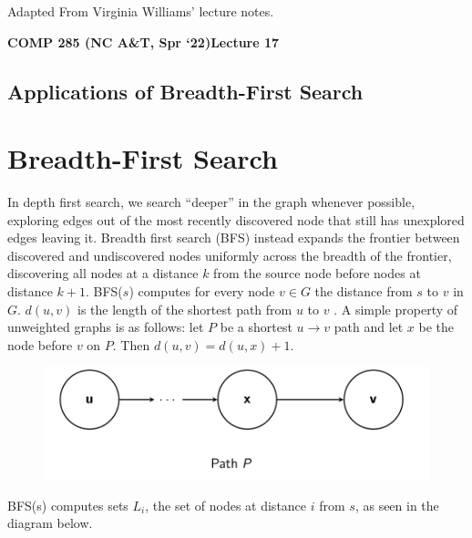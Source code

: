 \documentclass [12pt]{article}
\begin{document}
 

\vspace {1em} 
\begin {Instruction} 
Adapted From Virginia Williams' lecture notes.
\end {Instruction}  

{\LARGE \textbf {COMP 285 (NC A\&T, Spr `22)}\hfill \textbf {Lecture 17} } 

\begin{centering}
\section*{Applications of Breadth-First Search}
\end{centering}
 
 \section{Breadth-First Search}
 In depth first search, we search ``deeper'' in the graph whenever possible, exploring edges out of the most recently discovered node that still has unexplored edges leaving it. Breadth first search (BFS) instead expands the frontier between discovered and undiscovered nodes uniformly across the breadth of the frontier, discovering all nodes at a distance $k$ from the source node before nodes at distance $k + 1$. BFS($s$) computes for every node $v \in G$ the distance from $s$ to $v$ in $G$. $d(u, v )$ is the length of the shortest path from $u$ to $v$ . A simple property of unweighted graphs is as follows: let $P$ be a shortest $u \to v$ path and let $x$ be the node before $v$ on $P$. Then $d(u, v) = d(u, x) + 1$.

\begin{figure}[h!]
\centering
\includegraphics[scale=0.5]{bfs_path.png}
\end{figure}

BFS(s) computes sets $L_i$, the set of nodes at distance $i$ from $s$, as seen in the diagram below.
\end{document}

